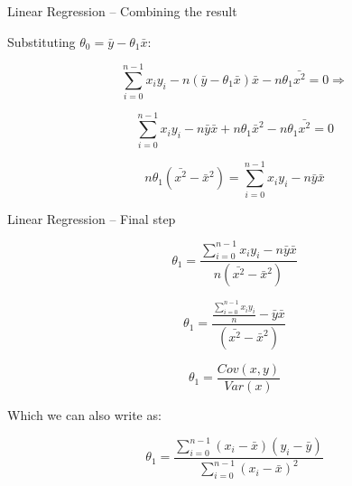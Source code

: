 \documentclass{beamer}
\begin{document}
\begin{frame}
{\centerline{Linear Regression -- Combining the result}}

Substituting $ \theta_0  = \bar{y} - \theta_1 \bar{x} $:

$$ \sum_{i=0}^{n-1}x_iy_i - n (\bar{y} - \theta_1 \bar{x}) \bar{x}  - n \theta_1 \bar{x^2} = 0 \Rightarrow $$

$$ \sum_{i=0}^{n-1}x_i y_i - n \bar{y}\bar{x} + n \theta_1 \bar{x}^2  - n \theta_1 \bar{x^2} = 0$$

$$ n \theta_1 (\bar{x^2}  - \bar{x}^2 ) = \sum_{i=0}^{n-1}x_i y_i - n \bar{y}\bar{x} $$
\end{frame}

\begin{frame}
{\centerline{Linear Regression -- Final step}}

$$ \theta_1  = \frac {\sum_{i=0}^{n-1}x_i y_i - n \bar{y}\bar{x}} {n (\bar{x^2}  - \bar{x}^2 ) } $$
\vspace*{0.2cm}

$$ \theta_1  = \frac { \frac {\sum_{i=0}^{n-1}x_i y_i}{n}  - \bar{y}\bar{x}} { (\bar{x^2}  - \bar{x}^2 ) } $$
\vspace*{0.2cm}

$$ \theta_1  = \frac { Cov(x,y)} { Var(x) } $$

Which we can also write as:

$$\theta_1 = \frac{\sum_{i=0}^{n-1}(x_i-\bar{x})(y_i-\bar{y})}{\sum_{i=0}^{n-1}(x_i-\bar{x})^2}$$


\end{frame}
\end{document}
